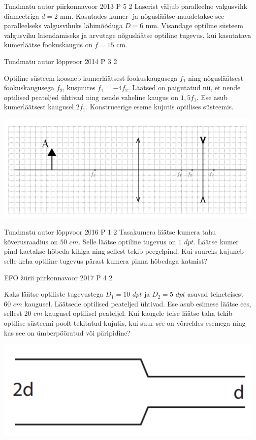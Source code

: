 \documentclass[11pt]{article}
\begin{document}
{%
{Tundmatu autor} %
{piirkonnavoor} %
{2013} %
{P 5} %
{2} %
{
\ifStatement
Laserist väljub paralleelne valgusvihk diameetriga $d = 2$ mm. Kasutades kumer- ja nõgusläätse muudetakse see paralleelseks valgusvihuks läbimõõduga $D = 6$ mm. Visandage optiline süsteem valgusvihu laiendamiseks ja arvutage nõgusläätse optiline tugevus, kui kasutatava kumerläätse fookuskaugus on $f = 15$ cm.
\fi
}


{Tundmatu autor} %
{lõppvoor} %
{2014} %
{P 3} %
{2} %
{
\ifStatement
Optiline süsteem koosneb kumerläätsest fookuskaugusega $f_1$ ning nõgusläätsest fookuskaugusega $f_2$, kusjuures $f_1 = -4f_2$. Läätsed on paigutatud nii, et nende optilised peateljed ühtivad ning nende vaheline kaugus on $1,5f_1$. Ese asub kumerläätsest kaugusel $2f_1$. Konstrueerige eseme kujutis optilises süsteemis. 
\begin{center}
	\includegraphics[width=0.5\linewidth]{2014-v3p-03-yl.PNG}
\end{center}
\fi
}
 


{Tundmatu autor} %
{lõppvoor} %
{2016} %
{P 1} %
{2} %
{
\ifStatement
Tasakumera läätse kumera tahu kõverusraadius on $50$ $cm$. Selle läätse optiline tugevus on $1$ $dpt$. Läätse kumer pind kaetakse hõbeda kihiga ning sellest tekib peegelpind. Kui suureks kujuneb selle keha optiline tugevus pärast kumera pinna hõbedaga katmist?
\fi
}


{EFO žürii} %
{piirkonnavoor} %
{2017} %
{P 4} %
{2} %
{
\ifStatement
Kaks läätse optiliste tugevustega $D_1 = 10$ $dpt$ ja $D_2 = 5$ $dpt$ asuvad teineteisest $60$ $cm$ kaugusel. Läätsede optilised peateljed ühtivad. Ese asub esimese läätse ees, sellest $20$ $cm$ kaugusel optilisel peateljel. Kui kaugele teise läätse taha tekib optilise süsteemi poolt tekitatud kujutis, kui suur see on võrreldes esemega ning kas see on ümberpööratud või päripidine? 
\begin{center}
	\includegraphics[width=0.5\linewidth]{2017-v2p-04-yl.PNG}
\end{center}
\fi
}


}
\end{document}
